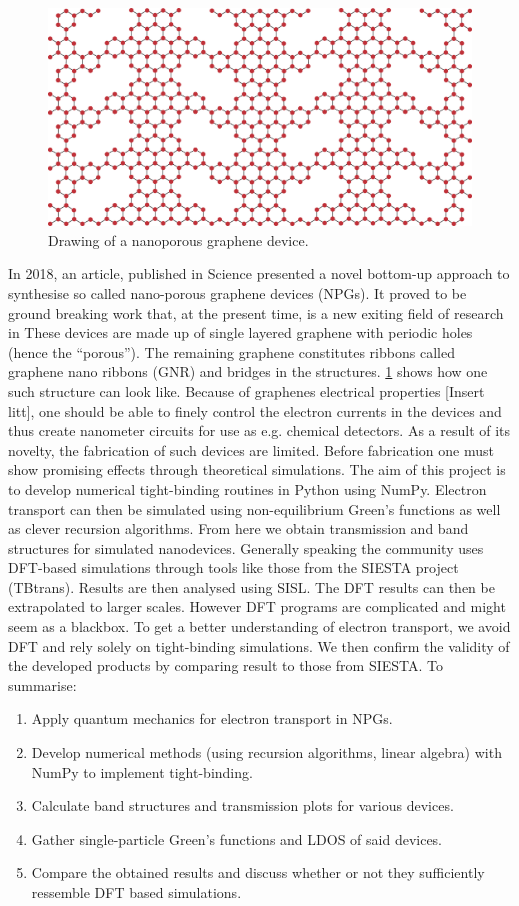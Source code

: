 \begin{figure}
	\vspace{-1em}
	\centering
	\includegraphics[width=.4\textwidth]{Figures/NPGintroGraphic.eps}
	\caption{Drawing of a nanoporous graphene device.}\label{introGraphic}
\end{figure}
In 2018, an article\cite{Moreno199}, published in Science presented a novel bottom-up approach to synthesise so called nano-porous graphene devices (NPGs). It proved to be ground breaking work that, at the present time, is a new exiting field of research in These devices are made up of single layered graphene with periodic holes (hence the ``porous''). The remaining graphene constitutes ribbons called graphene nano ribbons (GNR) and bridges in the structures. \cref{introGraphic} shows how one such structure can look like.
Because of graphenes electrical properties [Insert litt], one should be able to finely control the electron currents in the devices and thus create nanometer circuits for use as e.g. chemical detectors. As a result of its novelty, the fabrication of such devices are limited. Before fabrication one must show promising effects through theoretical simulations.\newline
The aim of this project is to develop numerical tight-binding routines in Python using NumPy. Electron transport can then be simulated using non-equilibrium Green's functions as well as clever recursion algorithms. From here we obtain transmission and band structures for simulated nanodevices.\newline
Generally speaking the community uses DFT-based simulations through tools like those from the SIESTA project (TBtrans). Results are then analysed using SISL\cite{zerothi_sisl}. The DFT results can then be extrapolated to larger scales\cite{calogero_electron_2019}. However DFT programs are complicated and might seem as a blackbox. To get a better understanding of electron transport, we avoid DFT and rely solely on tight-binding simulations. We then confirm the validity of the developed products by comparing result to those from SIESTA.\newline
To summarise:
\begin{enumerate}
	\item Apply quantum mechanics for electron transport in NPGs.
	\item Develop numerical methods (using recursion algorithms, linear algebra) with NumPy to implement tight-binding.
	\item Calculate band structures and transmission plots for various devices.
	\item Gather single-particle Green’s functions and LDOS of said devices.
	\item Compare the obtained results and discuss whether or not they sufficiently ressemble DFT based simulations.
\end{enumerate}
